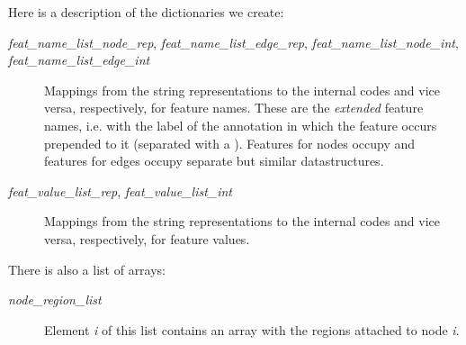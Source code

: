 \documentclass[letterpaper,10pt,english]{sphinxmanual}
\begin{document}
\begin{fulllineitems}
\begin{description}
\end{description}

Here is a description of the dictionaries we create:
\begin{description}
\item[{\emph{feat\_name\_list\_node\_rep}, \emph{feat\_name\_list\_edge\_rep}, \emph{feat\_name\_list\_node\_int}, \emph{feat\_name\_list\_edge\_int}}] \leavevmode
Mappings from the string representations to the internal codes and vice versa, respectively, for feature names.
These are the \emph{extended} feature names, i.e. with the label of the annotation in which the feature occurs prepended to it (separated with a ).
Features for nodes occupy and features for edges occupy separate but similar datastructures.

\item[{\emph{feat\_value\_list\_rep}, \emph{feat\_value\_list\_int}}] \leavevmode
Mappings from the string representations to the internal codes and vice versa, respectively, for feature values.

\end{description}

There is also a list of arrays:
\begin{description}
\item[{\emph{node\_region\_list}}] \leavevmode
Element \emph{i} of this list contains an array with the regions attached to node \emph{i}.

\end{description}

\begin{fulllineitems}
\label{graf/graf:graf.parse.AnnotationHandler.aid}
\end{fulllineitems}


\begin{fulllineitems}
\label{graf/graf:graf.parse.AnnotationHandler.alabel}
\end{fulllineitems}


\begin{fulllineitems}
\label{graf/graf:graf.parse.AnnotationHandler.aref}
\end{fulllineitems}


\end{fulllineitems}
\end{document}
